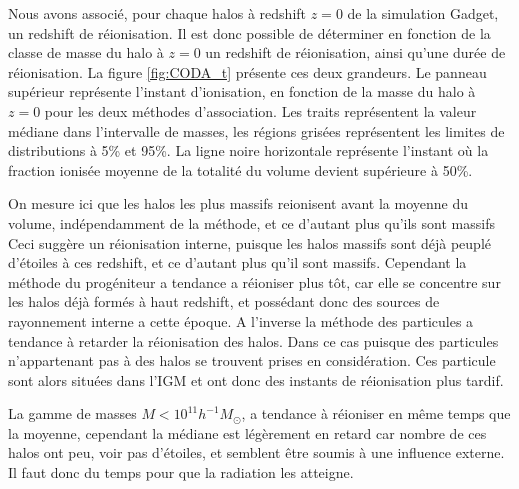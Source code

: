 Nous avons associé, pour chaque halos à redshift $z=0$ de la simulation Gadget, un redshift de réionisation.
Il est donc possible de déterminer en fonction de la classe de masse du halo à $z=0$ un redshift de réionisation, ainsi qu'une durée de réionisation.
La figure \ref{fig:CODA_t} présente ces deux grandeurs.
Le panneau supérieur représente l'instant d'ionisation, en fonction de la masse du halo à $z=0$ pour les deux méthodes d'association.
Les traits représentent la valeur médiane dans l'intervalle de masses, les régions grisées représentent les limites de distributions à 5\% et 95\%.
La ligne noire horizontale représente l'instant où la fraction ionisée moyenne de la totalité du volume devient supérieure à 50\%.

On mesure ici que les halos les plus massifs reionisent avant la moyenne du volume, indépendamment de la méthode, et ce d'autant plus qu'ils sont massifs
Ceci suggère un réionisation interne, puisque les halos massifs sont déjà peuplé d'étoiles à ces redshift, et ce d'autant plus qu'il sont massifs.
Cependant la méthode du progéniteur a tendance a réioniser plus tôt, car elle se concentre sur les halos déjà formés à haut redshift, et possédant donc des sources de rayonnement interne a cette époque.
A l'inverse la méthode des particules a tendance à retarder la réionisation des halos. 
Dans ce cas puisque des particules n'appartenant pas à des halos se trouvent prises en considération.
Ces particule sont alors situées dans l'\ac{IGM} et ont donc des instants de réionisation plus tardif.

La gamme de masses $M <10^{11} h^{-1}M_\odot$, a tendance à réioniser en même temps que la moyenne, cependant la médiane est légèrement en retard car nombre de ces halos ont peu, voir pas d'étoiles, et semblent être soumis à une influence externe.
Il faut donc du temps pour que la radiation les atteigne.



